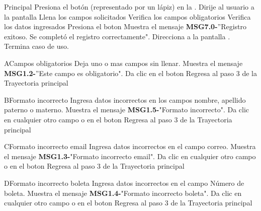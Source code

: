 	\begin{UCtrayectoria}{Principal}
	\UCpaso[\UCactor] Presiona el botón (representado por un lápiz) en la .
	\UCpaso Dirije al usuario a la pantalla 
	\UCpaso[\UCactor] Llena los campos solicitados
	\UCpaso Verifica los campos obligatorios  
	\UCpaso Verifica los datos ingresados        
	\UCpaso[\UCactor] Presiona el boton  
	\UCpaso Muestra el mensaje {\bf MSG7.0-}''Registro exitoso. Se completó el registro correctamente".
	\UCpaso Direcciona a la pantalla .
	\UCpaso Termina caso de uso.
\end{UCtrayectoria}

\begin{UCtrayectoriaA}{A}{Campos obligatorios}
	\UCpaso[\UCactor] Deja uno o mas campos sin llenar.
	\UCpaso Muestra el mensaje {\bf MSG1.2-}''Este campo es obligatorio".
	\UCpaso[\UCactor] Da clic en el boton 
	\UCpaso Regresa al paso 3 de la Trayectoria principal
\end{UCtrayectoriaA}

\begin{UCtrayectoriaA}{B}{Formato incorrecto}
	\UCpaso[\UCactor] Ingresa datos incorrectos en los campos nombre, apellido paterno o materno.
	\UCpaso Muestra el mensaje {\bf MSG1.5-}"Formato incorrecto".
	\UCpaso[\UCactor] Da clic en cualquier otro campo o en el boton 
	\UCpaso Regresa al paso 3 de la Trayectoria principal
\end{UCtrayectoriaA}

\begin{UCtrayectoriaA}{C}{Formato incorrecto email}
	\UCpaso[\UCactor] Ingresa datos incorrectos en el campo correo.
	\UCpaso Muestra el mensaje {\bf MSG1.3-}"Formato incorrecto email".
	\UCpaso[\UCactor] Da clic en cualquier otro campo o en el boton 
	\UCpaso Regresa al paso 3 de la Trayectoria principal
\end{UCtrayectoriaA}

\begin{UCtrayectoriaA}{D}{Formato incorrecto boleta}
	\UCpaso[\UCactor] Ingresa datos incorrectos en el campo Número de boleta.
	\UCpaso Muestra el mensaje {\bf MSG1.4-}"Formato incorrecto boleta".
	\UCpaso[\UCactor] Da clic en cualquier otro campo o en el boton 
	\UCpaso Regresa al paso 3 de la Trayectoria principal
\end{UCtrayectoriaA}

